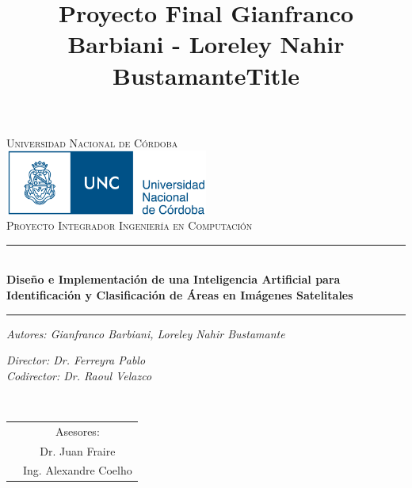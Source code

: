 \documentclass[a4paper,openright,12pt]{report}
\title{Proyecto Final Gianfranco Barbiani - Loreley Nahir Bustamante}
\begin{document}

\begin{titlepage}
\begin{center}

\textsc{Universidad Nacional de Córdoba}\\[1.5cm] %

\includegraphics[width=0.5\textwidth]{logo_unc.pdf}~\\[1cm]

\textsc{\Large Proyecto Integrador Ingeniería en Computación }\\[0.5cm] %

\rule{1.5\textwidth}{.4pt} %
\title{Title }\\[0.4cm] %
\textbf{\Huge{Diseño e Implementación de una Inteligencia Artificial para Identificación y Clasificación de Áreas en Imágenes Satelitales}}
\rule{1.5\textwidth}{.4pt} %
 
\begin{minipage}{0.4\textwidth}
\begin{flushleft} \large
\emph{Autores: Gianfranco Barbiani, Loreley Nahir Bustamante}\\


\end{flushleft}
\end{minipage}
\begin{minipage}{0.4\textwidth}
\begin{flushright} \large
\emph{Director: Dr. Ferreyra Pablo} \\
\emph{Codirector: Dr. Raoul Velazco} \\
 
\end{flushright}
\end{minipage}\\[1cm]

\begin{table}[H]
\centering
\label{my-label}
\begin{tabular}{cc}
           & Asesores:             \\
& Dr. Juan Fraire       \\
          & Ing. Alexandre Coelho
\end{tabular}
\end{table}


\end{center}
\end{titlepage}
\end{document}
